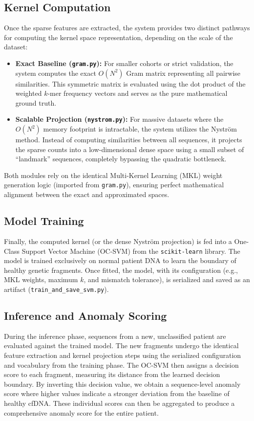 \subsection{Kernel Computation}
Once the sparse features are extracted, the system provides two distinct pathways for computing the kernel space representation, depending on the scale of the dataset:
\begin{itemize}
    \item \textbf{Exact Baseline (\texttt{gram.py}):} For smaller cohorts or strict validation, the system computes the exact $O(N^2)$ Gram matrix representing all pairwise similarities. This symmetric matrix is evaluated using the dot product of the weighted $k$-mer frequency vectors and serves as the pure mathematical ground truth.
    \item \textbf{Scalable Projection (\texttt{nystrom.py}):} For massive datasets where the $O(N^2)$ memory footprint is intractable, the system utilizes the Nystr\"{o}m method. Instead of computing similarities between all sequences, it projects the sparse counts into a low-dimensional dense space using a small subset of ``landmark'' sequences, completely bypassing the quadratic bottleneck.
\end{itemize}
Both modules rely on the identical Multi-Kernel Learning (MKL) weight generation logic (imported from \texttt{gram.py}), ensuring perfect mathematical alignment between the exact and approximated spaces.

\subsection{Model Training}
Finally, the computed kernel (or the dense Nystr\"{o}m projection) is fed into a One-Class Support Vector Machine (OC-SVM) from the \texttt{scikit-learn} library. 
The model is trained exclusively on normal patient DNA to learn the boundary of healthy genetic fragments. 
Once fitted, the model, with its configuration (e.g., MKL weights, maximum $k$, and mismatch tolerance), is serialized and saved as an artifact (\texttt{train\_and\_save\_svm.py}).

\subsection{Inference and Anomaly Scoring}
During the inference phase, sequences from a new, unclassified patient are evaluated against the trained model. 
The new fragments undergo the identical feature extraction and kernel projection steps using the serialized configuration and vocabulary from the training phase. 
The OC-SVM then assigns a decision score to each fragment, measuring its distance from the learned decision boundary. 
By inverting this decision value, we obtain a sequence-level anomaly score where higher values indicate a stronger deviation from the baseline of healthy cfDNA. 
These individual scores can then be aggregated to produce a comprehensive anomaly score for the entire patient.

